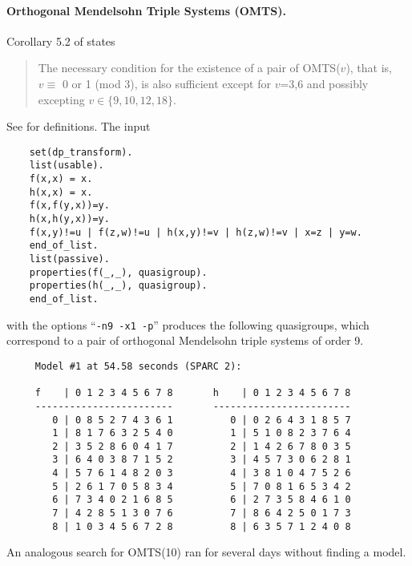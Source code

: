 \paragraph{Orthogonal Mendelsohn Triple Systems (OMTS).}
Corollary 5.2 of \cite{somts} states
\begin{quote}
The necessary condition for the existence of a pair of OMTS($v$),
that is, $v\equiv$ 0 or 1 (mod 3), is also sufficient except for
$v$=3,6 and possibly excepting $v\in \{9,10,12,18\}$.
\end{quote}
See \cite{somts} for definitions.  The input
{\small \begin{verbatim}
    set(dp_transform).
    list(usable).
    f(x,x) = x.
    h(x,x) = x.
    f(x,f(y,x))=y.
    h(x,h(y,x))=y.
    f(x,y)!=u | f(z,w)!=u | h(x,y)!=v | h(z,w)!=v | x=z | y=w.
    end_of_list.
    list(passive).
    properties(f(_,_), quasigroup).
    properties(h(_,_), quasigroup).
    end_of_list.
\end{verbatim}} \noindent
with the options ``\verb:-n9 -x1 -p:'' produces the following
quasigroups, which correspond to a pair of orthogonal Mendelsohn
triple systems of order 9.
{\small \begin{verbatim}
     Model #1 at 54.58 seconds (SPARC 2):

     f    | 0 1 2 3 4 5 6 7 8       h    | 0 1 2 3 4 5 6 7 8
     ------------------------       ------------------------
        0 | 0 8 5 2 7 4 3 6 1          0 | 0 2 6 4 3 1 8 5 7
        1 | 8 1 7 6 3 2 5 4 0          1 | 5 1 0 8 2 3 7 6 4
        2 | 3 5 2 8 6 0 4 1 7          2 | 1 4 2 6 7 8 0 3 5
        3 | 6 4 0 3 8 7 1 5 2          3 | 4 5 7 3 0 6 2 8 1
        4 | 5 7 6 1 4 8 2 0 3          4 | 3 8 1 0 4 7 5 2 6
        5 | 2 6 1 7 0 5 8 3 4          5 | 7 0 8 1 6 5 3 4 2
        6 | 7 3 4 0 2 1 6 8 5          6 | 2 7 3 5 8 4 6 1 0
        7 | 4 2 8 5 1 3 0 7 6          7 | 8 6 4 2 5 0 1 7 3
        8 | 1 0 3 4 5 6 7 2 8          8 | 6 3 5 7 1 2 4 0 8
\end{verbatim}} \noindent
An analogous search for OMTS(10) ran for several days without
finding a model.

